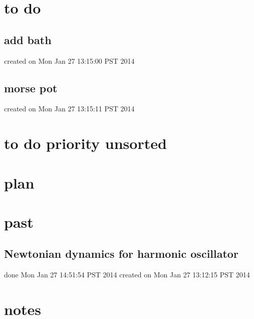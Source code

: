 \documentclass{article}
\begin{document}
\section{to do}
\subsection{add bath}
created on Mon Jan 27 13:15:00 PST 2014
\label{sub:add_bath}

\subsection{morse pot}
created on Mon Jan 27 13:15:11 PST 2014
\label{sub:morse_pot}

\section{to do priority unsorted}
\section{plan}
\section{past} %
\subsection{Newtonian dynamics for harmonic oscillator}
done Mon Jan 27 14:51:54 PST 2014
created on Mon Jan 27 13:12:15 PST 2014
\label{sub:newtonian_dynamics_for_harmonic_oscillator}

\section{notes}
\end{document}
